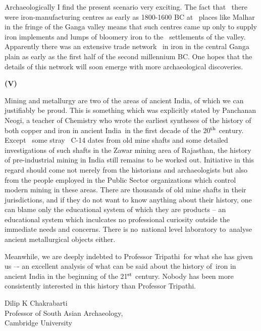Archaeologically I find the present scenario very exciting. The fact that  there were iron-manufacturing centres as early as 1800-1600 BC at  places like Malhar in the fringe of the Ganga valley means that such centres came up only to supply iron implements and lumps of bloomery iron to the  settlements of the valley. Apparently there was an extensive trade network  in iron in the central Ganga plain as early as the first half of the second millennium BC. One hopes that the details of this network will soon emerge with more archaeological discoveries.

\vspace{-.3cm}

\begin{center}{\textbf{(V)}}\end{center}

\vspace{-.3cm}

Mining and metallurgy are two of the areas of ancient India, of which we can justifiably be proud. This is something which was explicitly stated by Panchanan Neogi, a teacher of Chemistry who wrote the earliest syntheses of the history of both copper and iron in ancient India in the first decade of the 20$^{\rm th}$ century. Except  some stray  C-14 dates from old mine shafts and some detailed investigations of such shafts in the Zawar mining area of Rajasthan, the history of pre-industrial mining in India still remains to be worked out. Initiative in this regard should come not merely from the historians and archaeologists but also from the people employed in the Public Sector organizations which control modern mining in these areas. There are thousands of old mine shafts in their jurisdictions, and if they do not want to know anything about their history, one can blame only the educational system of which they are products – an educational system which inculcates no professional curiosity outside the immediate needs and concerns. There is no national level laboratory to analyse ancient metallurgical objects either.

Meanwhile, we are deeply indebted to Professor Tripathi for what she has given us –- an excellent analysis of what can be said about the history of iron in ancient India in the beginning of the 21$^{\rm st}$ century. Nobody has been more consistently interested in this history than Professor Tripathi.

Dilip K Chakrabarti\\ Professor of South Asian Archaeology,\\ Cambridge University
